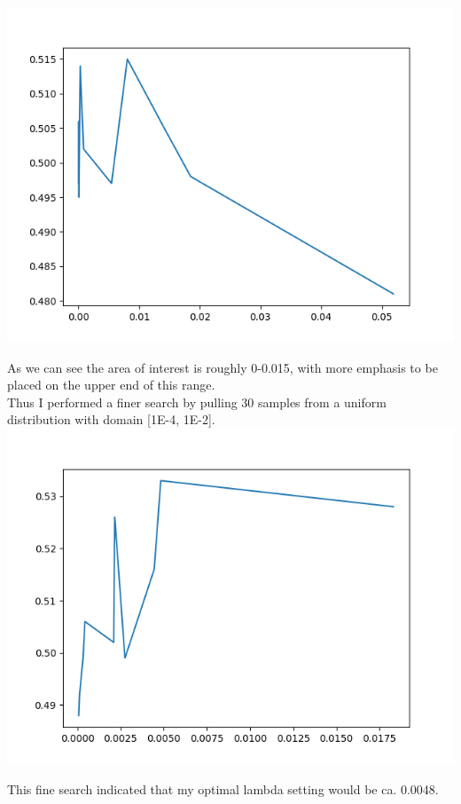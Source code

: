 \documentclass[11pt,a4paper]{article}
\begin{document}
\includegraphics[width=\textwidth]{coarse_search.png}

As we can see the area of interest is roughly 0-0.015, with more emphasis to be placed on the upper end of this range.\\

Thus I performed a finer search by pulling 30 samples from a uniform distribution with domain [1E-4, 1E-2].\\

\includegraphics[width=\textwidth]{fine_search.png}



This fine search indicated that my optimal lambda setting would be ca. 0.0048. \\
\end{document}
